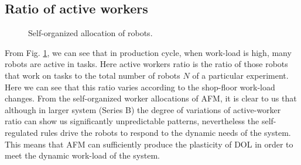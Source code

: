 \documentclass[journal]{IEEEtran}
\begin{document}
\subsection{Ratio of active workers}
\begin{figure}
\centering
{}
\newline
{}
\newline
{}
\newline
{}
\newline
\caption{Self-organized allocation of robots.} 
\label{fig:worker-stat}
\end{figure}
From Fig. \ref{fig:worker-stat}, we can  see that in production cycle, when work-load is high, many robots are active in tasks. Here active workers ratio is the ratio of those robots that work on tasks to the total number of robots $N$ of a particular experiment.   Here we can see that this ratio varies according to the shop-floor work-load changes.
From the self-organized worker allocations of AFM, it is clear to us that although in larger system (Series B) the degree of variations of active-worker ratio can show us significantly unpredictable patterns, nevertheless the self-regulated rules drive the robots to respond to the dynamic needs of the system. This means that AFM can sufficiently produce the plasticity of DOL in order to meet the dynamic work-load of the system.
\end{document}
